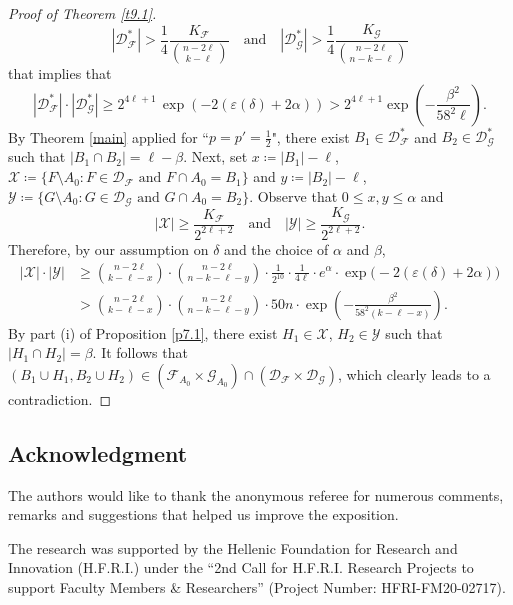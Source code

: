 \documentclass[10pt]{amsart}
\theoremstyle{remark}
\newcommand{\ee}{\varepsilon}
\newcommand{\meg}{\geqslant}
\newcommand{\mik}{\leqslant}
\newcommand{\Fcal}{\mathcal{F}}
\newcommand{\Gcal}{\mathcal{G}}
\newcommand{\Dcal}{\mathcal{D}}
\newcommand{\Xcal}{\mathcal{X}}
\newcommand{\Ycal}{\mathcal{Y}}
\begin{document}
\begin{proof}[Proof of Theorem \emph{\ref{t9.1}}]
\begin{equation}
|\Dcal_{\Fcal}^*|>\frac{1}{4} \frac{K_{\Fcal}}{\binom{n-2\ell}{k-\ell}} \ \ \
\text{ and } \ \ \ |\Dcal_{\Gcal}^*|>\frac14 \frac{K_{\Gcal}}{\binom{n-2\ell}{n-k-\ell}}
\end{equation}
that implies that
\begin{equation} \label{e9.19}
|\Dcal_{\Fcal}^*|\cdot |\Dcal_{\Gcal}^*| \meg 2^{4\ell+1}\,
\exp\left(-2(\varepsilon(\delta)+2\alpha)\right) >
2^{4\ell+1}\exp\left(-\frac{\beta^2}{58^2\ell}\right).
\end{equation}
By Theorem \ref{main} applied for ``$p=p'=\frac12$", there exist
$B_1\in \Dcal_{\Fcal}^*$ and $B_2\in \Dcal_{\Gcal}^*$ such that $\left|B_1\cap B_2\right|=\ell-\beta$.
Next, set $x\coloneqq |B_1|-\ell$, $\Xcal\coloneqq \{F\setminus A_0:F\in \Dcal_\Fcal \text{ and } F\cap A_0=B_1\}$ and
$y\coloneqq |B_2|-\ell$, $\Ycal\coloneqq \{G\setminus A_0:G\in \Dcal_\Gcal \text{ and } G\cap A_0=B_2\}$.
Observe that $0\mik x,y\mik\alpha$ and
\begin{equation} \label{e9.20}
|\Xcal|\meg \frac{K_{\Fcal}}{2^{2\ell+2}} \ \ \ \text{ and } \ \ \
|\Ycal|\meg \frac{K_{\Gcal}}{2^{2\ell+2}}.
\end{equation}
Therefore, by our assumption on $\delta$ and the choice of $\alpha$ and $\beta$,
\begin{align}
\label{e9.21} |\Xcal|\cdot |\Ycal| & \meg \binom{n-2\ell}{k-\ell-x}\cdot
\binom{n-2\ell}{n-k-\ell-y}\cdot \frac{1}{2^{10}}\cdot \frac{1}{4\ell}\cdot e^\alpha\cdot
\exp\big(-2(\ee(\delta)+2\alpha)\big) \\
& > \binom{n-2\ell}{k-\ell-x}\cdot \binom{n-2\ell}{n-k-\ell-y}
\cdot 50n\cdot  \exp\left(-\frac{\beta^2}{58^2(k-\ell-x)}\right). \nonumber
\end{align}
By part (i) of Proposition \ref{p7.1}, there exist $H_1\in\Xcal$, $H_2\in \Ycal$ such that $\left|H_1\cap H_2\right|=\beta$.
It follows that $(B_1\cup H_1,B_2\cup H_2)\in (\Fcal_{A_0}\times\Gcal_{A_0})\cap(\Dcal_{\Fcal}\times\Dcal_{\Gcal})$,
which clearly leads to a contradiction.
\end{proof}

\subsection*{Acknowledgment}

The authors would like to thank the anonymous referee for numerous comments, remarks and suggestions
that helped us improve the exposition.

The research was supported by the Hellenic Foundation for Research and Innovation
(H.F.R.I.) under the “2nd Call for H.F.R.I. Research Projects to support
Faculty Members \& Researchers” (Project Number: HFRI-FM20-02717).
\end{document}
